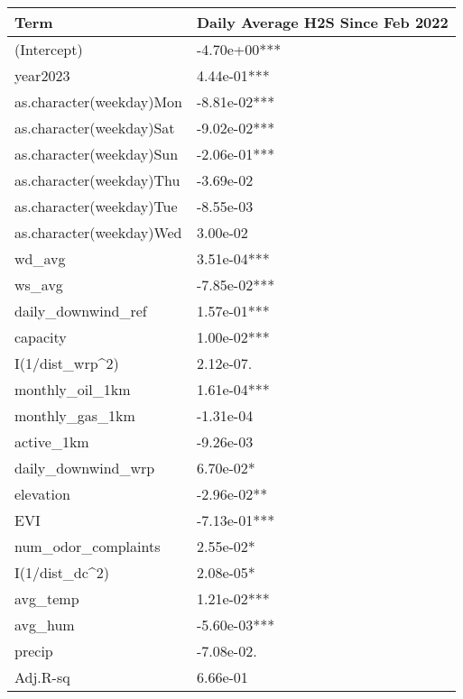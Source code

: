 
\begin{tabular}{l|l}
\hline
Term & Daily Average H2S Since Feb 2022\\
\hline
(Intercept) & -4.70e+00***\\
\hline
year2023 & 4.44e-01***\\
\hline
as.character(weekday)Mon & -8.81e-02***\\
\hline
as.character(weekday)Sat & -9.02e-02***\\
\hline
as.character(weekday)Sun & -2.06e-01***\\
\hline
as.character(weekday)Thu & -3.69e-02\\
\hline
as.character(weekday)Tue & -8.55e-03\\
\hline
as.character(weekday)Wed & 3.00e-02\\
\hline
wd\_avg & 3.51e-04***\\
\hline
ws\_avg & -7.85e-02***\\
\hline
daily\_downwind\_ref & 1.57e-01***\\
\hline
capacity & 1.00e-02***\\
\hline
I(1/dist\_wrp\textasciicircum{}2) & 2.12e-07.\\
\hline
monthly\_oil\_1km & 1.61e-04***\\
\hline
monthly\_gas\_1km & -1.31e-04\\
\hline
active\_1km & -9.26e-03\\
\hline
daily\_downwind\_wrp & 6.70e-02*\\
\hline
elevation & -2.96e-02**\\
\hline
EVI & -7.13e-01***\\
\hline
num\_odor\_complaints & 2.55e-02*\\
\hline
I(1/dist\_dc\textasciicircum{}2) & 2.08e-05*\\
\hline
avg\_temp & 1.21e-02***\\
\hline
avg\_hum & -5.60e-03***\\
\hline
precip & -7.08e-02.\\
\hline
Adj.R-sq & 6.66e-01\\
\hline
\end{tabular}
